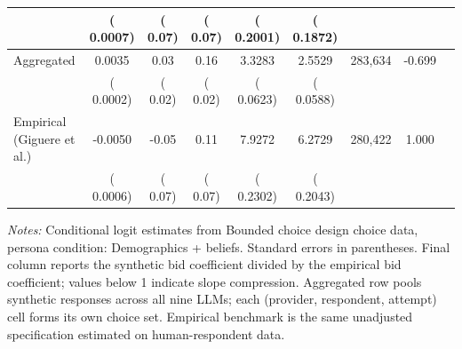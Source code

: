 \begin{table}[h]
\begin{threeparttable}
\begin{tabular}{lcccccccr}
 & (   0.0007) & (     0.07) & (     0.07) & (   0.2001) & (   0.1872) & & \\
\midrule
Aggregated &    0.0035 &      0.03 &      0.16 &    3.3283 &    2.5529 &   283,634 & -0.699 \\
 & (   0.0002) & (     0.02) & (     0.02) & (   0.0623) & (   0.0588) & & \\
\midrule
Empirical (Giguere et al.) &   -0.0050 &     -0.05 &      0.11 &    7.9272 &    6.2729 &   280,422 & 1.000 \\
 & (   0.0006) & (     0.07) & (     0.07) & (   0.2302) & (   0.2043) & & \\
\bottomrule
\end{tabular}
\begin{tablenotes}\footnotesize
\item \textit{Notes:} Conditional logit estimates from Bounded choice design choice data, persona condition: Demographics + beliefs. 
Standard errors in parentheses. 
Final column reports the synthetic bid coefficient divided by the empirical bid coefficient; values below 1 indicate slope compression. 
Aggregated row pools synthetic responses across all nine LLMs; each (provider, respondent, attempt) cell forms its own choice set. 
Empirical benchmark is the same unadjusted specification estimated on \textcite{Giguere2020} human-respondent data.
\end{tablenotes}
\end{threeparttable}
\end{table}
